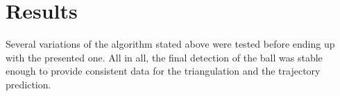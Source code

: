 \section{Results}
Several variations of the algorithm stated above were tested before ending up with the presented one. 
All in all, the final detection of the ball was stable enough to provide consistent data for the triangulation and the trajectory prediction.

